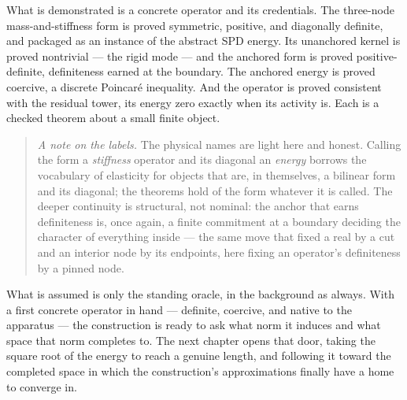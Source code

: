 What is demonstrated is a concrete operator and its credentials. The three-node mass-and-stiffness form
is proved symmetric, positive, and diagonally definite, and packaged as an instance of the abstract SPD
energy. Its unanchored kernel is proved nontrivial --- the rigid mode --- and the anchored form is proved
positive-definite, definiteness earned at the boundary. The anchored energy is proved coercive, a
discrete Poincar\'e inequality. And the operator is proved consistent with the residual tower, its
energy zero exactly when its activity is. Each is a checked theorem about a small finite object.

\begin{quote}
\emph{A note on the labels.} The physical names are light here and honest. Calling the form a
\emph{stiffness} operator and its diagonal an \emph{energy} borrows the vocabulary of elasticity for
objects that are, in themselves, a bilinear form and its diagonal; the theorems hold of the form
whatever it is called. The deeper continuity is structural, not nominal: the anchor that earns
definiteness is, once again, a finite commitment at a boundary deciding the character of everything
inside --- the same move that fixed a real by a cut and an interior node by its endpoints, here fixing
an operator's definiteness by a pinned node.
\end{quote}

What is assumed is only the standing oracle, in the background as always. With a first concrete operator
in hand --- definite, coercive, and native to the apparatus --- the construction is ready to ask what
norm it induces and what space that norm completes to. The next chapter opens that door, taking the
square root of the energy to reach a genuine length, and following it toward the completed space in
which the construction's approximations finally have a home to converge in.
